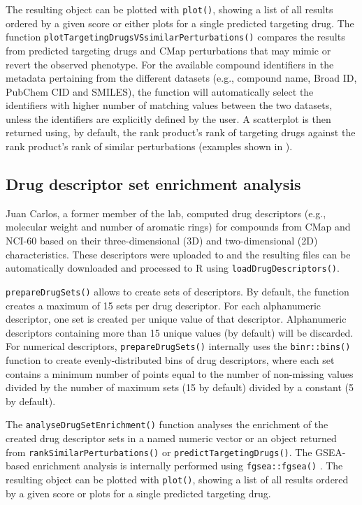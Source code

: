 The resulting object can be plotted with \texttt{plot()}, showing a list of all results ordered by a given score or either plots for a single predicted targeting drug. The function \texttt{plotTargetingDrugsVSsimilarPerturbations()} compares the results from predicted targeting drugs and CMap perturbations that may mimic or revert the observed phenotype. For the available compound identifiers in the metadata pertaining from the different datasets (e.g., compound name, Broad ID, PubChem CID and SMILES), the function will automatically select the identifiers with higher number of matching values between the two datasets, unless the identifiers are explicitly defined by the user. A scatterplot is then returned using, by default, the rank product’s rank of targeting drugs against the rank product’s rank of similar perturbations (examples shown in ).

\subsection{Drug descriptor set enrichment analysis}
\label{subsec:descriptor-set-enrichment}

Juan Carlos, a former member of the lab, computed drug descriptors (e.g., molecu\-lar weight and number of aromatic rings) for compounds from CMap and NCI-60 based on their three-dimensional (3D) and two-dimensional (2D) characteristics. These descriptors were uploaded to  and the resulting files can be automatically downloaded and processed to R using \texttt{loadDrugDescriptors()}.

\texttt{prepareDrugSets()} allows to create sets of descriptors. By default, the function creates a maximum of 15 sets per drug descriptor. For each alphanumeric descriptor, one set is created per unique value of that descriptor. Alphanumeric descriptors containing more than 15 unique values (by default) will be discarded. For numerical descriptors, \texttt{prepareDrugSets()} internally uses the \texttt{binr::bins()} function to create evenly-distributed bins of drug descriptors, where each set contains a minimum number of points equal to the number of non-missing values divided by the number of maximum sets (15 by default) divided by a constant (5 by default).

The \texttt{analyseDrugSetEnrichment()} function analyses the enrichment of the created drug descriptor sets in a named numeric vector or an object returned from \texttt{rankSimilarPerturbations()} or \texttt{predictTargetingDrugs()}. The GSEA-based enrichment analysis is internally performed using \texttt{fgsea::fgsea()} \cite{sergushichev:2016aa}. The resulting object can be plotted with \texttt{plot()}, showing a list of all results ordered by a given score or plots for a single predicted targeting drug.

